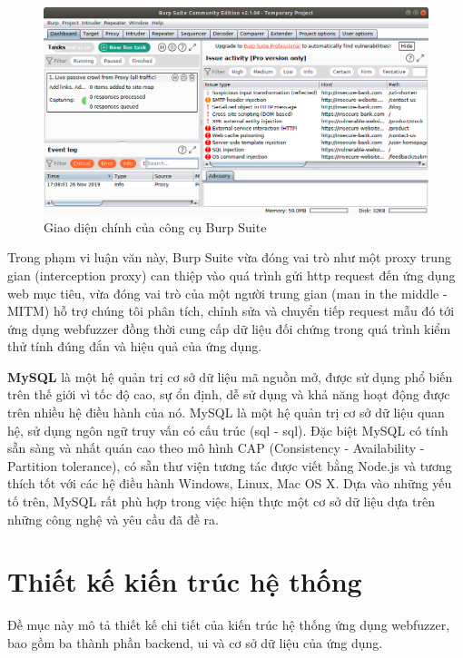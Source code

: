 \begin{figure}[H]
  \centering
    \includegraphics[width=\textwidth,keepaspectratio=true]{images/burp-suite-usage.png}
  \caption{Giao diện chính của công cụ Burp Suite}
  \label{fig:burp-suite-usage}
\end{figure}
Trong phạm vi luận văn này, Burp Suite vừa đóng vai trò như một proxy trung gian (interception proxy) can thiệp vào quá trình gửi \acrshort{http} request đến ứng dụng web mục tiêu, vừa đóng vai trò của một người trung gian (man in the middle - MITM) hỗ trợ chúng tôi phân tích, chỉnh sửa và chuyển tiếp request mẫu đó tới ứng dụng webfuzzer đồng thời cung cấp dữ liệu đối chứng trong quá trình kiểm thử tính đúng đắn và hiệu quả của ứng dụng.\par
\textbf{MySQL} là một hệ quản trị cơ sở dữ liệu mã nguồn mở, được sử dụng phổ biến trên thế giới vì tốc độ cao, sự ổn định, dễ sử dụng và khả năng hoạt động được trên nhiều hệ điều hành của nó. MySQL là một hệ quản trị cơ sở dữ liệu quan hệ, sử dụng ngôn ngữ truy vấn có cấu trúc (\acrlong{sql} - \acrshort{sql}). Đặc biệt MySQL có tính sẵn sàng và nhất quán cao theo mô hình CAP (Consistency - Availability - Partition tolerance), có sẵn thư viện tương tác được viết bằng Node.js và tương thích tốt với các hệ điều hành Windows, Linux, Mac OS X. Dựa vào những yếu tố trên, MySQL rất phù hợp trong việc hiện thực một cơ sở dữ liệu dựa trên những công nghệ và yêu cầu đã đề ra.
\section{Thiết kế kiến trúc hệ thống}
Đề mục này mô tả thiết kế chi tiết của kiến trúc hệ thống ứng dụng webfuzzer, bao gồm ba thành phần backend, \acrshort{ui} và cơ sở dữ liệu của ứng dụng.
